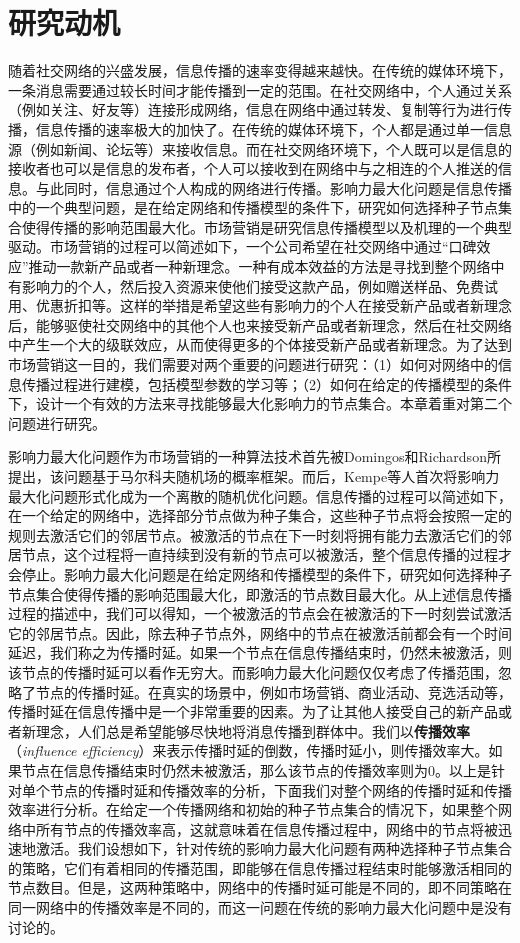 \section{研究动机}
\label{3sec:motivation}
随着社交网络的兴盛发展，信息传播的速率变得越来越快。在传统的媒体环境下，一条消息需要通过较长时间才能传播到一定的范围。在社交网络中，个人通过关系（例如关注、好友等）连接形成网络，信息在网络中通过转发、复制等行为进行传播，信息传播的速率极大的加快了。在传统的媒体环境下，个人都是通过单一信息源（例如新闻、论坛等）来接收信息。而在社交网络环境下，个人既可以是信息的接收者也可以是信息的发布者，个人可以接收到在网络中与之相连的个人推送的信息。与此同时，信息通过个人构成的网络进行传播。影响力最大化问题是信息传播中的一个典型问题，是在给定网络和传播模型的条件下，研究如何选择种子节点集合使得传播的影响范围最大化。市场营销是研究信息传播模型以及机理的一个典型驱动。市场营销的过程可以简述如下，一个公司希望在社交网络中通过“口碑效应”推动一款新产品或者一种新理念。一种有成本效益的方法是寻找到整个网络中有影响力的个人，然后投入资源来使他们接受这款产品，例如赠送样品、免费试用、优惠折扣等。这样的举措是希望这些有影响力的个人在接受新产品或者新理念后，能够驱使社交网络中的其他个人也来接受新产品或者新理念，然后在社交网络中产生一个大的级联效应，从而使得更多的个体接受新产品或者新理念。为了达到市场营销这一目的，我们需要对两个重要的问题进行研究：（1）如何对网络中的信息传播过程进行建模，包括模型参数的学习等；（2）如何在给定的传播模型的条件下，设计一个有效的方法来寻找能够最大化影响力的节点集合。本章着重对第二个问题进行研究。

影响力最大化问题作为市场营销的一种算法技术首先被Domingos和Richardson所提出，该问题基于马尔科夫随机场的概率框架。而后，Kempe等人首次将影响力最大化问题形式化成为一个离散的随机优化问题。信息传播的过程可以简述如下，在一个给定的网络中，选择部分节点做为种子集合，这些种子节点将会按照一定的规则去激活它们的邻居节点。被激活的节点在下一时刻将拥有能力去激活它们的邻居节点，这个过程将一直持续到没有新的节点可以被激活，整个信息传播的过程才会停止。影响力最大化问题是在给定网络和传播模型的条件下，研究如何选择种子节点集合使得传播的影响范围最大化，即激活的节点数目最大化。从上述信息传播过程的描述中，我们可以得知，一个被激活的节点会在被激活的下一时刻尝试激活它的邻居节点。因此，除去种子节点外，网络中的节点在被激活前都会有一个时间延迟，我们称之为传播时延。如果一个节点在信息传播结束时，仍然未被激活，则该节点的传播时延可以看作无穷大。而影响力最大化问题仅仅考虑了传播范围，忽略了节点的传播时延。在真实的场景中，例如市场营销、商业活动、竞选活动等，传播时延在信息传播中是一个非常重要的因素。为了让其他人接受自己的新产品或者新理念，人们总是希望能够尽快地将消息传播到群体中。我们以\textbf{传播效率}（\textit{influence efficiency}）来表示传播时延的倒数，传播时延小，则传播效率大。如果节点在信息传播结束时仍然未被激活，那么该节点的传播效率则为0。以上是针对单个节点的传播时延和传播效率的分析，下面我们对整个网络的传播时延和传播效率进行分析。在给定一个传播网络和初始的种子节点集合的情况下，如果整个网络中所有节点的传播效率高，这就意味着在信息传播过程中，网络中的节点将被迅速地激活。我们设想如下，针对传统的影响力最大化问题有两种选择种子节点集合的策略，它们有着相同的传播范围，即能够在信息传播过程结束时能够激活相同的节点数目。但是，这两种策略中，网络中的传播时延可能是不同的，即不同策略在同一网络中的传播效率是不同的，而这一问题在传统的影响力最大化问题中是没有讨论的。

